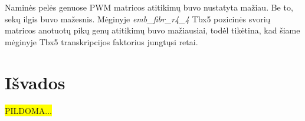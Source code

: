 \documentclass[12pt]{article}
\begin{document}
Naminės pelės genuose PWM matricos atitikimų buvo nustatyta mažiau. Be to, sekų
ilgis buvo mažesnis. Mėginyje \emph{emb\_fibr\_r4\_4} Tbx5 pozicinės svorių
matricos anotuotų pikų genų atitikimų buvo mažiausiai, todėl tikėtina, kad šiame
mėginyje Tbx5 transkripcijos faktorius jungtųsi retai.


\newpage


\section{Išvados}
\colorbox{yellow}{PILDOMA...}

\newpage

\end{document}
